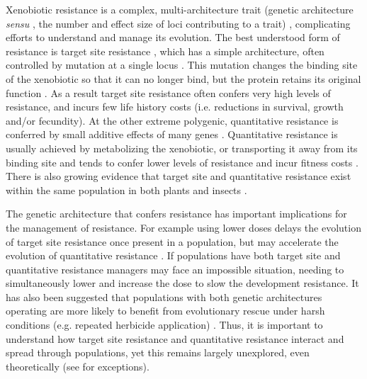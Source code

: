 \documentclass[10pt,letterpaper]{article}
\begin{document}
Xenobiotic resistance is a complex, multi-architecture trait (genetic architecture \textit{sensu} \cite{Deba2015}, the number and effect size of loci contributing to a trait) \cite{Warw1991, Neve2007, Dely2013, Bauc2016}, complicating efforts to understand and manage its evolution. The best understood form of resistance is target site resistance \cite{Warw1991, Neve2007, Dely2013, Serv2013}, which has a simple architecture, often controlled by mutation at a single locus \cite{Bauc2016}. This mutation changes the binding site of the xenobiotic so that it can no longer bind, but the protein retains its original function \cite{Dely2013, Bauc2016}. As a result target site resistance often confers very high levels of resistance, and incurs few life history costs (i.e. reductions in survival, growth and/or fecundity)\cite{Warw1994, Vila2005, Bauc2016}. At the other extreme polygenic, quantitative resistance is conferred by small additive effects of many genes \cite{Land1989, Mack2009, Dely2013, Rajo2013}. Quantitative resistance is usually achieved by metabolizing the xenobiotic, or transporting it away from its binding site \cite{Dely2013, Bauc2016} and tends to confer lower levels of resistance and incur fitness costs \cite{Vila2005, Bauc2016}. There is also growing evidence that target site and quantitative resistance exist within the same population in both plants \cite{Warw1991, Vila2005, Herr2014, Han2016} and insects \cite{Gard1998, Donn2009, Bing2011, Hend2013, Oake2013}.

The genetic architecture that confers resistance has important implications for the management of resistance. For example using lower doses delays the evolution of target site resistance once present in a population, but may accelerate the evolution of quantitative resistance \cite{Gard1998}. If populations have both target site and quantitative resistance managers may face an impossible situation, needing to simultaneously lower and increase the dose to slow the development resistance. It has also been suggested that populations with both genetic architectures operating are more likely to benefit from evolutionary rescue under harsh conditions (e.g. repeated herbicide application) \cite{Gomu2010}. Thus, it is important to understand how target site resistance and quantitative resistance interact and spread through populations, yet this remains largely unexplored, even theoretically (see \cite{Gomu2010, Deba2015, Yeam2015} for exceptions). 
\end{document}
